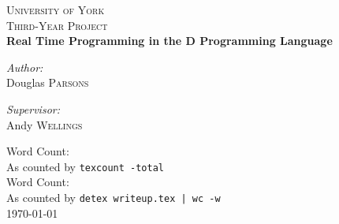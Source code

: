 \begin{titlepage}
\begin{center}


\textsc{\LARGE University of York}\\[1.5cm]

\textsc{\Large Third-Year Project}\\[0.5cm]

\HRule{\\[0.4cm]}
{\huge\bfseries{Real Time Programming in the D Programming Language}\\[0.4cm] }

\HRule{\\[1.5cm]}

\noindent
\begin{minipage}[t]{0.4\textwidth}
\begin{flushleft} \large
\emph{Author:}\\
Douglas \textsc{Parsons}
\end{flushleft}
\end{minipage}
\begin{minipage}[t]{0.4\textwidth}
\begin{flushright} \large
\emph{Supervisor:} \\
Andy \textsc{Wellings}
\end{flushright}
\end{minipage}

\vfill
 
{\small Word Count: \wordcount \\}
\vspace{5mm}
{\small As counted by \texttt{texcount -total} \\}
\vspace{5mm}
{\small Word Count: \wrdcount \\}
\vspace{5mm}
{\small As counted by \texttt{detex writeup.tex | wc -w} \\}
\vspace{15mm}
{\large \today}

\end{center}
\end{titlepage}
